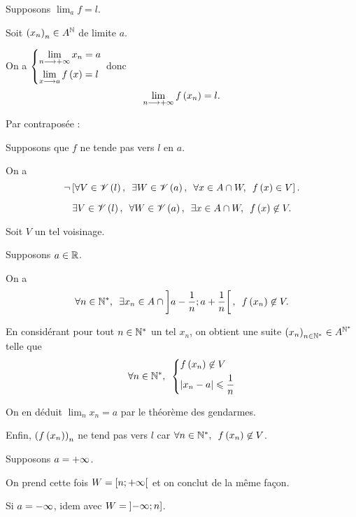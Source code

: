 \begin{dem}
\impdir

Supposons \(\lim_af=l\).

Soit \(\left(x_n\right)_n\in A^{\mathbb{N}}\) de limite \(a\).

On a \(\begin{dcases}\lim_{n\longrightarrow+\infty}x_n=a \\ \lim_{x\longrightarrow a}f\left(x\right)=l\end{dcases}\) donc \[\lim_{n\longrightarrow+\infty}f\left(x_n\right)=l.\]

\imprec

Par contraposée :

Supposons que \(f\) ne tende pas vers \(l\) en \(a\).

On a \[\non\croch{\quantifs{\forall V\in\V{l};\exists W\in\V{a};\forall x\in A\inter W}f\paren{x}\in V}.\]

\Cad \[\quantifs{\exists V\in\V{l};\forall W\in\V{a};\exists x\in A\inter W}f\paren{x}\not\in V.\]

Soit \(V\) un tel voisinage.

Supposons \(a\in\mathbb{R}\).

On a \[\quantifs{\forall n\in\Ns;\exists x_n\in A\inter\intervee{a-\dfrac{1}{n}}{a+\dfrac{1}{n}}}f\paren{x_n}\not\in V.\]

En considérant pour tout \(n\in\mathbb{N}^*\) un tel \(x_n\), on obtient une suite \(\left(x_n\right)_{n\in\mathbb{N}^*}\in A^{\mathbb{N}^*}\) telle que \[\quantifs{\forall n\in\Ns}\begin{dcases}f\paren{x_n}\not\in V \\ \abs{x_n-a}\leq\dfrac{1}{n}\end{dcases}\]

On en déduit \(\lim_nx_n=a\) par le théorème des gendarmes.

Enfin, \(\left(f\left(x_n\right)\right)_n\) ne tend pas vers \(l\) car \(\quantifs{\forall n\in\Ns}f\paren{x_n}\not\in V\).

Supposons \(a=+\infty\).

On prend cette fois \(W=\left[n;+\infty\right[\) et on conclut de la même façon.

Si \(a=-\infty\), idem avec \(W=\left]-\infty;n\right]\).
\end{dem}


